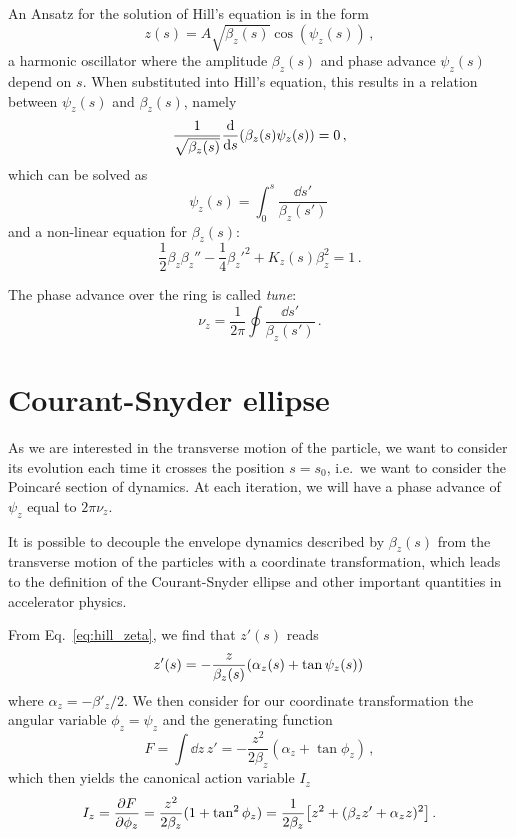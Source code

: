An Ansatz for the solution of Hill's equation is in the form
\begin{equation}
	z(s)=A\sqrt{\beta_z(s)}\cos\left(\psi_z(s)\right)\,,
	\label{eq:hill_zeta}
\end{equation}
%
\ie a harmonic oscillator where the amplitude $\beta_z(s)$ and phase advance $\psi_z(s)$ depend on $s$. When substituted into Hill's equation, this results in a relation between $\psi_z(s)$ and $\beta_z(s)$, namely
%
\begin{equation}
	\frac{1}{\sqrt{\beta_z(s)}} \dv{s}(\beta_z(s)\psi_z(s)) = 0\,,
\end{equation}
%
which can be solved as
%
\begin{equation}
	\psi_z(s) = \int_0^s \frac{\dd s'}{\beta_z(s')}\,
\end{equation}
%
and a non-linear equation for $\beta_z(s)$:
%
\begin{equation}
	\frac{1}{2}\beta_z\beta_z''-\frac{1}{4}\beta_z'^2+K_z(s)\beta_z^2=1\,.
\end{equation}

The phase advance over the ring is called \textit{tune}:
\begin{equation}
	\nu_z = \frac{1}{2\pi}\oint \frac{\dd s'}{\beta_z(s')}\,.
    \label{eq:tune_def}
\end{equation} 


\section{Courant-Snyder ellipse} \label{sec:acc:cs_ellipse}

As we are interested in the transverse motion of the particle, we want to consider its evolution each time it crosses the position $s=s_0$, i.e.\ we want to consider the Poincaré section of dynamics. At each iteration, we will have a phase advance of $\psi_z$ equal to $2\pi\nu_z$.

It is possible to decouple the envelope dynamics described by $\beta_z(s)$ from the transverse motion of the particles with a coordinate transformation, which leads to the definition of the Courant-Snyder ellipse and other important quantities in accelerator physics.

From Eq.~\eqref{eq:hill_zeta}, we find that $z'(s)$ reads
%
\begin{equation}
	z'(s)=-\frac{z}{\beta_z(s)}\qty(\alpha_z(s)+\tan\psi_z(s))\,
\end{equation}
%
where $\alpha_z=-\beta'_z/2$. We then consider for our coordinate transformation the angular variable $\phi_z=\psi_z$ and the generating function
%
\begin{equation}
	F=\int \dd z\, z' = -\frac{z^2}{2\beta_z}(\alpha_z+\tan\phi_z) \,,
\end{equation}
%
which then yields the canonical action variable $I_z$
%
\begin{equation}
	I_z=\pdv{F}{\phi_z}=\frac{z^2}{2\beta_z}(1+\tan^2\phi_z)=\frac{1}{2\beta_z}\qty[z^2+(\beta_z z'+\alpha_z z)^2]\,.
	\label{eq:jz}
\end{equation}

